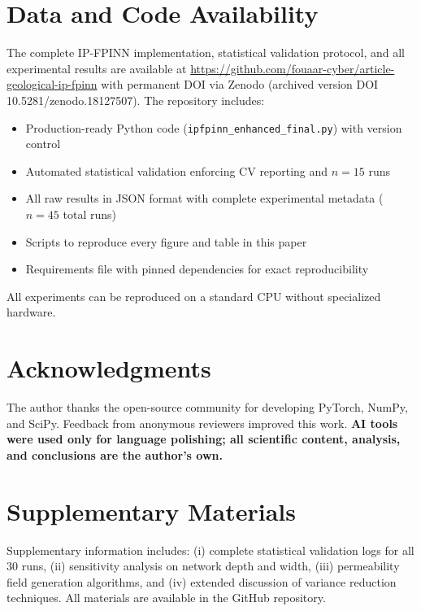 \documentclass[sn-mathphys]{sn-jnl}
\begin{document}
	\section*{Data and Code Availability}
	\label{sec:availability}
	The complete IP-FPINN implementation, statistical validation protocol, and all experimental results are available at \url{https://github.com/fouaar-cyber/article-geological-ip-fpinn} with permanent DOI via Zenodo  (archived version DOI 10.5281/zenodo.18127507). The repository includes:
	\begin{itemize}
		\item Production-ready Python code (\texttt{ipfpinn\_enhanced\_final.py}) with version control
		\item Automated statistical validation enforcing CV reporting and $n=15$ runs
		\item All raw results in JSON format with complete experimental metadata ($n=45$ total runs)
		\item Scripts to reproduce every figure and table in this paper
		\item Requirements file with pinned dependencies for exact reproducibility
	\end{itemize}
	All experiments can be reproduced on a standard CPU without specialized hardware.
	
\section*{Acknowledgments}
The author thanks the open-source community for developing PyTorch, 
NumPy, and SciPy. Feedback from anonymous reviewers improved this work. 
\textbf{AI tools were used only for language polishing; all scientific 
	content, analysis, and conclusions are the author's own.}
	\section*{Supplementary Materials}
	\label{sec:supplement}
	Supplementary information includes: (i) complete statistical validation logs for all 30 runs, (ii) sensitivity analysis on network depth and width, (iii) permeability field generation algorithms, and (iv) extended discussion of variance reduction techniques. All materials are available in the GitHub repository.
	
	
	
\end{document}
